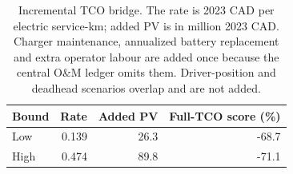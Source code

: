 \begin{table}[htbp]
\centering
\begin{tabular}{@{}lrrr@{}}
\toprule
Bound & Rate & Added PV & Full-TCO score (\%)\\
\midrule
Low & 0.139 & 26.3 & -68.7\\
High & 0.474 & 89.8 & -71.1\\
\bottomrule
\end{tabular}
\caption{Incremental TCO bridge. The rate is 2023 CAD per electric service-km; added PV is in million 2023 CAD. Charger maintenance, annualized battery replacement and extra operator labour are added once because the central O\&M ledger omits them. Driver-position and deadhead scenarios overlap and are not added.}
\label{tab:tco_bridge}
\end{table}
